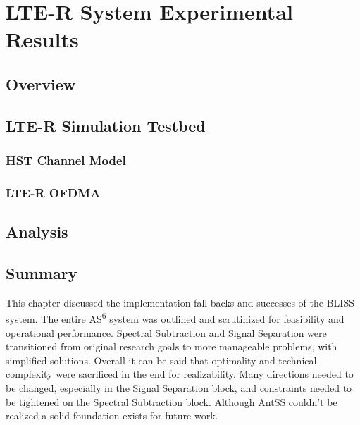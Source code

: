 \chapter{LTE-R System Experimental Results}
\label{chapter7}

\section{Overview}

\section{LTE-R Simulation Testbed}
\subsection{HST Channel Model}
\subsection{LTE-R OFDMA}

\section{Analysis}

\section{Summary}
This chapter discussed the implementation fall-backs and successes of the BLISS system.  The entire AS\textsuperscript{6} system was outlined and scrutinized for feasibility and operational performance.  Spectral Subtraction and Signal Separation were transitioned from original research goals to more manageable problems, with simplified solutions.  Overall it can be said that optimality and technical complexity were sacrificed in the end for realizability.  Many directions needed to be changed, especially in the Signal Separation block, and constraints needed to be tightened on the Spectral Subtraction block.  Although AntSS couldn't be realized a solid foundation exists for future work.\\ 







